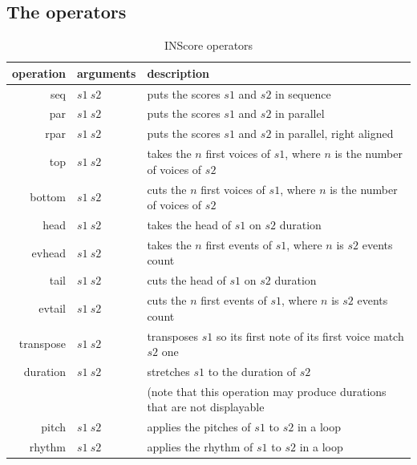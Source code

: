 \documentclass{article}
\begin{document}
\subsection{The operators}

\begin{table}[htdp]
\begin{center}
\begin{tabular}{rll}
\hline
operation & arguments		&	description \\
\hline
seq 	&	$s1\ s2$		& puts the scores $s1$ and $s2$ in sequence \\
par 	&	$s1\ s2$		& puts the scores $s1$ and $s2$ in parallel \\ 
rpar	&	$s1\ s2$		& puts the scores $s1$ and $s2$ in parallel, right aligned \\
top 	&	$s1\ s2$ 	& takes the $n$ first voices of $s1$, where $n$ is the number of voices of $s2$ \\
bottom 	&	$s1\ s2$ 	& cuts the $n$ first voices of $s1$, where $n$ is the number of voices of $s2$  \\
head	& 	$s1\ s2$	& takes the head of $s1$ on $s2$ duration \\
evhead 	&	$s1\ s2$	& takes the $n$ first events of $s1$, where $n$ is $s2$ events count \\
tail	&	$s1\ s2$ 	& cuts the head of $s1$ on $s2$ duration \\
evtail 	&	$s1\ s2$ 	& cuts the $n$ first events of $s1$, where $n$ is $s2$ events count \\
transpose 	&	$s1\ s2$	& transposes $s1$ so its first note of its first voice match $s2$ one \\
duration 	&	$s1\ s2$	& stretches $s1$ to the duration of $s2$  \\
			& 	& (note that this operation may produce durations that are not displayable\\
pitch 	&	$s1\ s2$	& applies the pitches of $s1$ to $s2$ in a loop \\
rhythm 	&	$s1\ s2$	& applies the rhythm of $s1$ to $s2$ in a loop \\
\hline
\end{tabular}
\end{center}

\caption{INScore operators}
\label{operations}
\end{table}
\end{document}
